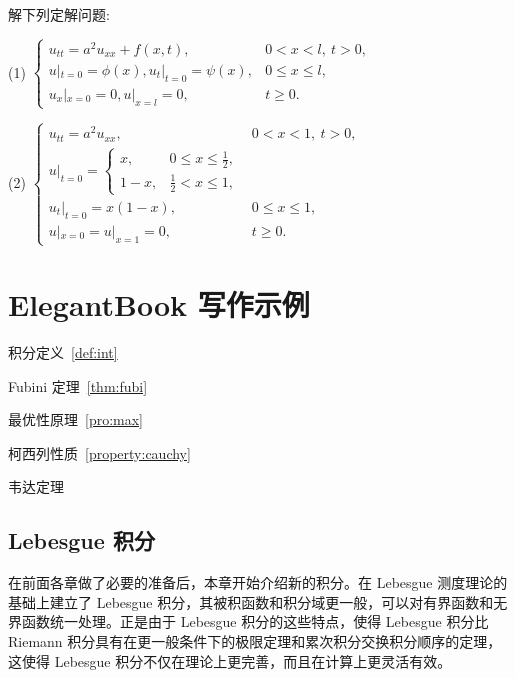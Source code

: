 \documentclass[color=blue,lang=cn,newtx,10pt,scheme=chinese]{elegantbook}
\begin{document}
\begin{exercise}
  解下列定解问题:

  (1) $\begin{cases}
    u_{tt}=a^2u_{xx}+f(x,t), & 0<x<l,\ t>0,\\
    u|_{t=0} =\phi (x),u_t|_{t=0}=\psi (x), & 0\leq x\leq l,\\
    u_x|_{x=0}=0,u|_{x=l}=0, & t\geq 0.
  \end{cases}$
  
  \quad
  
  (2) $\begin{cases}
    u_{tt}=a^2u_{xx}, & 0<x<1,\ t>0,\\
    u|_{t=0}=
    \begin{cases}
      x, & 0\leq x\leq \frac{1}{2},\\
      1-x, & \frac{1}{2}<x\leq 1,
    \end{cases}\\
    u_t|_{t=0}=x(1-x), & 0\leq x\leq 1,\\
    u|_{x=0}=u|_{x=1}=0, & t\geq 0.
    \end{cases}$
\end{exercise}
\quad

\begin{solution}
  
\end{solution}



\chapter{ElegantBook 写作示例}%

\begin{introduction}
  \item 积分定义~\ref{def:int}
  \item Fubini 定理~\ref{thm:fubi}
  \item 最优性原理~\ref{pro:max}
  \item 柯西列性质~\ref{property:cauchy}
  \item 韦达定理
\end{introduction}

\section{Lebesgue 积分}
在前面各章做了必要的准备后，本章开始介绍新的积分。在 Lebesgue 测度理论的基础上建立了 Lebesgue 积分，其被积函数和积分域更一般，可以对有界函数和无界函数统一处理。正是由于 Lebesgue 积分的这些特点，使得 Lebesgue 积分比 Riemann 积分具有在更一般条件下的极限定理和累次积分交换积分顺序的定理，这使得 Lebesgue 积分不仅在理论上更完善，而且在计算上更灵活有效。
\end{document}
